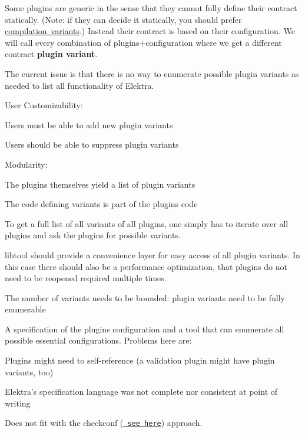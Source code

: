 Some plugins are generic in the sense that they cannot fully define their contract statically. (Note\+: if they can decide it statically, you should prefer \mbox{\hyperlink{doc_tutorials_compilation-variants_md}{compilation variants}}.) Instead their contract is based on their configuration. We will call every combination of plugins+configuration where we get a different contract {\bfseries{plugin variant}}.

The current issue is that there is no way to enumerate possible plugin variants as needed to list all functionality of Elektra.


\begin{DoxyItemize}
\item User Customizability\+:
\begin{DoxyItemize}
\item Users must be able to add new plugin variants
\item Users should be able to suppress plugin variants
\end{DoxyItemize}
\item Modularity\+:
\begin{DoxyItemize}
\item The plugins themselves yield a list of plugin variants
\item The code defining variants is part of the plugin\textquotesingle{}s code
\item To get a full list of all variants of all plugins, one simply has to iterate over all plugins and ask the plugins for possible variants.
\end{DoxyItemize}
\item libtool should provide a convenience layer for easy access of all plugin variants. In this case there should also be a performance optimization, that plugins do not need to be reopened required multiple times.
\end{DoxyItemize}


\begin{DoxyItemize}
\item The number of variants needs to be bounded\+: plugin variants need to be fully enumerable
\end{DoxyItemize}

A specification of the plugin\textquotesingle{}s configuration and a tool that can enumerate all possible essential configurations. Problems here are\+:


\begin{DoxyItemize}
\item Plugins might need to self-\/reference (a validation plugin might have plugin variants, too)
\item Elektra’s specification language was not complete nor consistent at point of writing
\item Does not fit with the {\ttfamily checkconf} (\href{https://git.libelektra.org/issues/559}{\texttt{ see here}}) approach.
\end{DoxyItemize}

